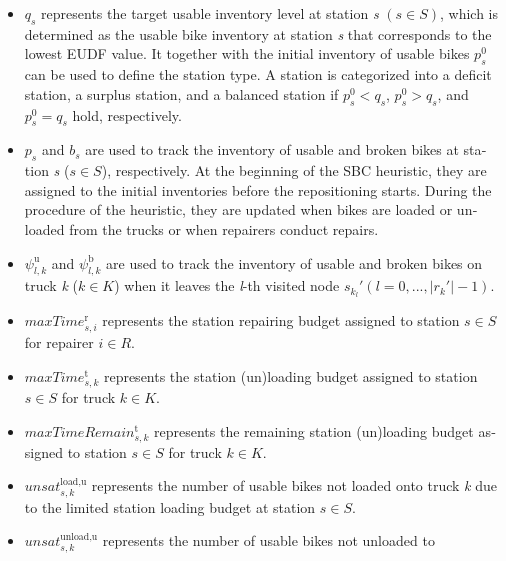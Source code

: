 \documentclass[
  english,
]{article}
\begin{document}
\begin{otherlanguage}{english}
\begin{itemize}
\item
  \protect{}\label{p0330}
  \(q_{s}\) represents the target usable inventory level at station \emph{s}
  \(\left( {s \in S} \right)\), which is determined as the usable bike inventory at station \emph{s}
  that corresponds to the lowest EUDF value. It together with the initial inventory of usable bikes
  \(p_{s}^{0}\) can be used to define the station type. A station is categorized into a deficit
  station, a surplus station, and a balanced station if \(p_{s}^{0} < q_{s}\),
  \(p_{s}^{0} > q_{s}\), and \(p_{s}^{0} = q_{s}\) hold, respectively.
\item
  \protect{}\label{p0335}
  \(p_{s}\) and \(b_{s}\) are used to track the inventory of usable and broken bikes at station
  \emph{s} (\(s \in S\)), respectively. At the beginning of the SBC heuristic, they are assigned to
  the initial inventories before the repositioning starts. During the procedure of the heuristic,
  they are updated when bikes are loaded or unloaded from the trucks or when repairers conduct
  repairs.
\item
  \protect{}\label{p0340}
  \(\psi_{l,k}^{\text{u}}\) and \(\psi_{l,k}^{\text{b}}\) are used to track the inventory of usable
  and broken bikes on truck \emph{k} (\(k \in K\)) when it leaves the \emph{l}-th visited node
  \(s_{k_{l}}'\left( {l = 0,...,\left| r_{k}' \right| - 1} \right)\).
\item
  \protect{}\label{p0345}
  \(\mathit{maxTim}e_{s,i}^{\text{r}}\) represents the station repairing budget assigned to station
  \(s \in S\) for repairer \(i \in R\).
\item
  \protect{}\label{p0350}
  \(\mathit{maxTim}e_{s,k}^{\text{t}}\) represents the station (un)loading budget assigned to
  station \(s \in S\) for truck \(k \in K\).
\item
  \protect{}\label{p0355}
  \(\mathit{maxTimeRemai}n_{s,k}^{\text{t}}\) represents the remaining station (un)loading budget
  assigned to station \(s \in S\) for truck \(k \in K\).
\item
  \protect{}\label{p0360}
  \(\mathit{unsa}t_{s,k}^{\text{load,u}}\) represents the number of usable bikes not loaded onto
  truck \emph{k} due to the limited station loading budget at station \(s \in S\).
\item
  \protect{}\label{p0365}
  \(\mathit{unsa}t_{s,k}^{\text{unload,u}}\) represents the number of usable bikes not unloaded to

\end{itemize}
\end{otherlanguage}
\end{document}
